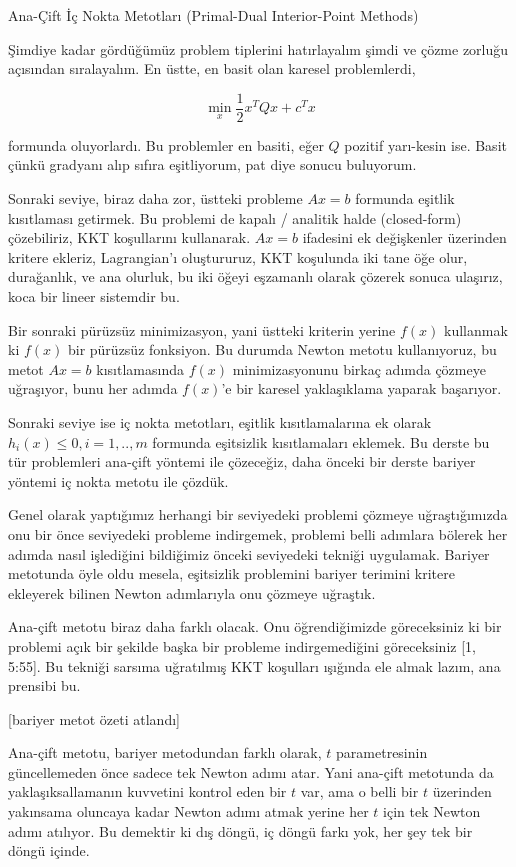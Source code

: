 \documentclass[12pt,fleqn]{article}\usepackage{../../common}
\begin{document}
Ana-Çift İç Nokta Metotları (Primal-Dual Interior-Point Methods)

Şimdiye kadar gördüğümüz problem tiplerini hatırlayalım şimdi ve çözme
zorluğu açısından sıralayalım. En üstte, en basit olan karesel
problemlerdi, 

$$
\min_x \frac{1}{2}  x^T Q x + c^T x
$$

formunda oluyorlardı. Bu problemler en basiti, eğer $Q$ pozitif yarı-kesin
ise. Basit çünkü gradyanı alıp sıfıra eşitliyorum, pat diye sonucu
buluyorum. 

Sonraki seviye, biraz daha zor, üstteki probleme $Ax=b$ formunda eşitlik
kısıtlaması getirmek. Bu problemi de kapalı / analitik halde (closed-form)
çözebiliriz, KKT koşullarını kullanarak. $Ax=b$ ifadesini ek değişkenler
üzerinden kritere ekleriz, Lagrangian'ı oluştururuz, KKT koşulunda iki tane
öğe olur, durağanlık, ve ana olurluk, bu iki öğeyi eşzamanlı olarak çözerek
sonuca ulaşırız, koca bir lineer sistemdir bu. 

Bir sonraki pürüzsüz minimizasyon, yani üstteki kriterin yerine $f(x)$
kullanmak ki $f(x)$ bir pürüzsüz fonksiyon. Bu durumda Newton metotu
kullanıyoruz, bu metot $Ax=b$ kısıtlamasında $f(x)$ minimizasyonunu birkaç
adımda çözmeye uğraşıyor, bunu her adımda $f(x)$'e bir karesel yaklaşıklama
yaparak başarıyor. 

Sonraki seviye ise iç nokta metotları, eşitlik kısıtlamalarına ek olarak
$h_i(x) \le 0, i=1,..,m$ formunda eşitsizlik kısıtlamaları eklemek.  Bu
derste bu tür problemleri ana-çift yöntemi ile çözeceğiz, daha önceki bir
derste bariyer yöntemi iç nokta metotu ile çözdük. 

Genel olarak yaptığımız herhangi bir seviyedeki problemi çözmeye
uğraştığımızda onu bir önce seviyedeki probleme indirgemek, problemi belli
adımlara bölerek her adımda nasıl işlediğini bildiğimiz önceki seviyedeki
tekniği uygulamak. Bariyer metotunda öyle oldu mesela, eşitsizlik
problemini bariyer terimini kritere ekleyerek bilinen Newton adımlarıyla
onu çözmeye uğraştık. 

Ana-çift metotu biraz daha farklı olacak. Onu öğrendiğimizde göreceksiniz
ki bir problemi açık bir şekilde başka bir probleme indirgemediğini
göreceksiniz [1, 5:55]. Bu tekniği sarsıma uğratılmış KKT koşulları
ışığında ele almak lazım, ana prensibi bu.

[bariyer metot özeti atlandı]

Ana-çift metotu, bariyer metodundan farklı olarak, $t$ parametresinin
güncellemeden önce sadece tek Newton adımı atar. Yani ana-çift metotunda da
yaklaşıksallamanın kuvvetini kontrol eden bir $t$ var, ama o belli bir $t$
üzerinden yakınsama oluncaya kadar Newton adımı atmak yerine her $t$ için
tek Newton adımı atılıyor. Bu demektir ki dış döngü, iç döngü farkı yok,
her şey tek bir döngü içinde.
\end{document}

